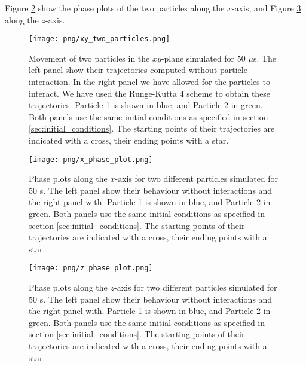 Figure \ref{fig:x_phase_two_particles} show the phase plots of the two particles along the $x$-axis, and Figure \ref{fig:z_phase_two_particles} along the $z$-axis.
\newpage
\onecolumngrid


\begin{figure}
    \texttt{[image: png/xy\_two\_particles.png]}
    \caption{Movement of two particles in the $xy$-plane simulated for $50$ $\mu$s. The left panel show their trajectories computed without particle interaction. In the right panel we have allowed for the particles to interact. We have used the Runge-Kutta 4 scheme to obtain these trajectories. Particle 1 is shown in blue, and Particle 2 in green. Both panels use the same initial conditions as specified in section \ref{sec:initial_conditions}. The starting points of their trajectories are indicated with a cross, their ending points with a star. }
    \label{fig:xy_two_particles}
\end{figure}

\begin{figure}
    \texttt{[image: png/x\_phase\_plot.png]}
    \caption{Phase plots along the $x$-axis for two different particles simulated for 50 \textmu s. The left panel show their behaviour without interactions and the right panel with. Particle 1 is shown in blue, and Particle 2 in green. Both panels use the same initial conditions as specified in section \ref{sec:initial_conditions}. The starting points of their trajectories are indicated with a cross, their ending points with a star.}
    \label{fig:x_phase_two_particles}
\end{figure} 

\begin{figure}
    \texttt{[image: png/z\_phase\_plot.png]}
    \caption{Phase plots along the $z$-axis for two different particles simulated for 50 \textmu s. The left panel show their behaviour without interactions and the right panel with. Particle 1 is shown in blue, and Particle 2 in green. Both panels use the same initial conditions as specified in section \ref{sec:initial_conditions}. The starting points of their trajectories are indicated with a cross, their ending points with a star.}
    \label{fig:z_phase_two_particles}
\end{figure}

